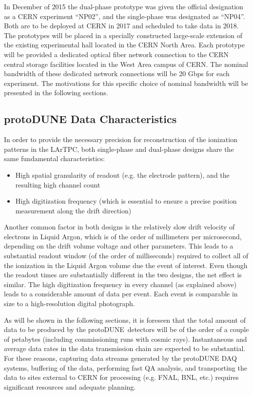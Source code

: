 \documentclass[pdftex,12pt,letter]{article}
\newcommand{\pd}{protoDUNE\ }
\begin{document}
In December of 2015 the dual-phase prototype was given the official designation as a CERN experiment “NP02”, and the single-phase was designated as “NP04”. Both are to be deployed at CERN in 2017 and scheduled to take data in 2018. The prototypes will be placed in a specially constructed large-scale extension of the existing experimental hall located in the CERN North Area. Each prototype will be provided a dedicated optical fiber network connection to the CERN central storage facilities located in the West Area campus of CERN. The nominal bandwidth of these dedicated network connections will be 20 Gbps for each experiment. The motivations for this specific choice of nominal bandwidth will be presented in the following sections.

\subsection{protoDUNE Data Characteristics}

In order to provide the necessary precision for reconstruction of the ionization patterns in the LArTPC, both single-phase and dual-phase designs share the same fundamental characteristics:
\begin{itemize}
\item High spatial granularity of readout (e.g. the electrode pattern), and the resulting high channel count
\item High digitization frequency (which is essential to ensure a precise position measurement along the drift direction)
\end{itemize}

Another common factor in both designs is the relatively slow drift velocity of electrons in Liquid Argon, which is of the order of millimeters per microsecond, depending on the drift volume voltage and other parameters. This leads to a substantial readout window (of the order of milliseconds) required to collect all of the ionization in the Liquid Argon volume due the event of interest. Even though the readout times are substantially different in the two designs, the net effect is similar. The high digitization frequency in every channel (as explained above) leads to a considerable amount of data per event.  Each event is comparable in size to a high-resolution digital photograph.

As will be shown in the following sections, it is foreseen that the total amount of data to be produced by the \pd detectors will be of the order of a couple of petabytes (including commissioning runs with cosmic rays). Instantaneous and average data rates in the data transmission chain are expected to be substantial. For these reasons, capturing data streams generated by the protoDUNE DAQ systems, buffering of the data, performing fast QA analysis, and transporting the data to sites external to CERN for processing (e.g. FNAL, BNL, etc.) requires significant resources and adequate planning.
\end{document}
